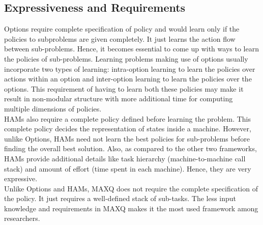 \subsection{Expressiveness and Requirements}
Options require complete specification of policy and would learn only if the policies to subproblems are given completely. It just learns the action flow between sub-problems. Hence, it becomes essential to come up with ways to learn the policies of sub-problems. Learning problems making use of options usually incorporate two types of learning: intra-option learning to learn the policies over actions within an option and inter-option learning to learn the policies over the options. This requirement of having to learn both these policies may make it result in non-modular structure with more additional time for computing multiple dimensions of policies. \\

HAMs also require a complete policy defined before learning the problem. This complete policy decides the representation of states inside a machine. However, unlike Options, HAMs need not learn the best policies for sub-problems before finding the overall best solution. Also, as compared to the other two frameworks, HAMs provide additional details like task hierarchy (machine-to-machine call stack) and amount of effort (time spent in each machine). Hence, they are very expressive. \\

Unlike Options and HAMs, MAXQ does not require the complete specification of the policy. It just requires a well-defined stack of sub-tasks. The less input knowledge and requirements in MAXQ makes it the most used framework among researchers. \\


